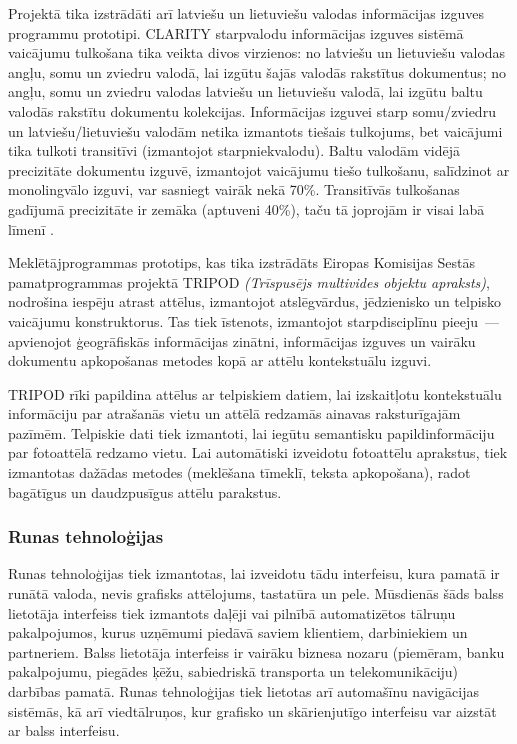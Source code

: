 \begin{multicols}{2}
Projektā tika izstrādāti arī latviešu un lietuviešu valodas informācijas izguves programmu prototipi.
CLARITY starpvalodu informācijas izguves sistēmā vaicājumu tulkošana tika veikta divos virzienos: no latviešu un lietuviešu valodas angļu, somu un zviedru valodā, lai izgūtu šajās valodās rakstītus dokumentus; no angļu, somu un zviedru valodas latviešu un lietuviešu valodā, lai izgūtu baltu valodās rakstītu dokumentu kolekcijas.
Informācijas izguvei starp somu/zviedru un latviešu/lietuviešu valodām netika izmantots tiešais tulkojums, bet vaicājumi tika tulkoti transitīvi (izmantojot starpniekvalodu).
Baltu valodām vidējā precizitāte dokumentu izguvē, izmantojot vaicājumu tiešo tulkošanu, salīdzinot ar monolingvālo izguvi, var sasniegt vairāk nekā 70\%.
Transitīvās tulkošanas gadījumā precizitāte ir zemāka (aptuveni 40\%), taču tā joprojām ir visai labā līmenī \cite{meta18}.

Meklētājprogrammas prototips, kas tika izstrādāts Eiropas Komisijas Sestās pamatprogrammas projektā TRIPOD \textit{(Trīspusējs multivides objektu apraksts)}, nodrošina iespēju atrast attēlus, izmantojot atslēgvārdus, jēdzienisko un telpisko vaicājumu konstruktorus.
Tas tiek īstenots, izmantojot starpdisciplīnu pieeju~--- apvienojot ģeogrāfiskās informācijas zinātni, informācijas izguves un vairāku dokumentu apkopošanas metodes kopā ar attēlu kontekstuālu izguvi. 

TRIPOD rīki papildina attēlus ar telpiskiem datiem, lai izskaitļotu kontekstuālu informāciju par atrašanās vietu un attēlā redzamās ainavas raksturīgajām pazīmēm.
Telpiskie dati tiek izmantoti, lai iegūtu semantisku papildinformāciju par fotoattēlā redzamo vietu.
Lai automātiski izveidotu fotoattēlu aprakstus, tiek izmantotas dažādas metodes (meklēšana tīmeklī, teksta apkopošana), radot bagātīgus un daudzpusīgus attēlu parakstus.
  
\subsubsection{Runas tehnoloģijas}


Runas tehnoloģijas tiek izmantotas, lai izveidotu tādu interfeisu, kura pamatā ir runātā valoda, nevis grafisks attēlojums, tastatūra un pele.
Mūsdienās šāds balss lietotāja interfeiss tiek izmantots daļēji vai pilnībā automatizētos tālruņu pakalpojumos, kurus uzņēmumi piedāvā saviem klientiem, darbiniekiem un partneriem.
Balss lietotāja interfeiss ir vairāku biznesa nozaru (piemēram, banku pakalpojumu, piegādes ķēžu, sabiedriskā transporta un telekomunikāciju) darbības pamatā.
Runas tehnoloģijas tiek lietotas arī automašīnu navigācijas sistēmās, kā arī viedtālruņos, kur grafisko un skārienjutīgo interfeisu var aizstāt ar balss interfeisu. 


\end{multicols}
